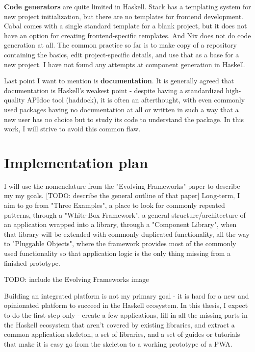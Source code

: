 \documentclass[english,odsaz]{fitthesis}
\begin{document}
\textbf{Code generators} are quite limited in Haskell. Stack has a templating system for
new project initialization, but there are no templates for frontend development.
Cabal comes with a single standard template for a blank project, but it does not
have an option for creating frontend-specific templates. And Nix does not do
code generation at all. The common practice so far is to make copy of a
repository containing the basics, edit project-specific details, and use that as
a base for a new project. I have not found any attempts at component generation
in Haskell.

Last point I want to mention is \textbf{documentation}. It is generally agreed that
documentation is Haskell's weakest point - despite having a standardized
high-quality APIdoc tool (haddock), it is often an afterthought, with even
commonly used packages having no documentation at all or written in such a way
that a new user has no choice but to study its code to understand the
package. In this work, I will strive to avoid this common flaw.

\section{Implementation plan}
\label{sec:orgc7c9975}
I will use the nomenclature from the "Evolving Frameworks" paper
\cite{roberts1996evolving} to describe my my goals. [TODO: describe the general
outline of that paper] Long-term, I aim to go from "Three Examples", a place to
look for commonly repeated patterns, through a "White-Box Framework", a general
structure/architecture of an application wrapped into a library, through a
"Component Library", when that library will be extended with commonly duplicated
functionality, all the way to "Pluggable Objects", where the framework provides
most of the commonly used functionality so that application logic is the only
thing missing from a finished prototype.

TODO: include the Evolving Frameworks image

Building an integrated platform is not my primary goal - it is hard for a new
and opinionated platform to succeed in the Haskell ecosystem. In this thesis, I
expect to do the first step only - create a few applications, fill in all the
missing parts in the Haskell ecosystem that aren't covered by existing
libraries, and extract a common application skeleton, a set of libraries, and a
set of guides or tutorials that make it is easy go from the skeleton to a
working prototype of a PWA.
\end{document}
